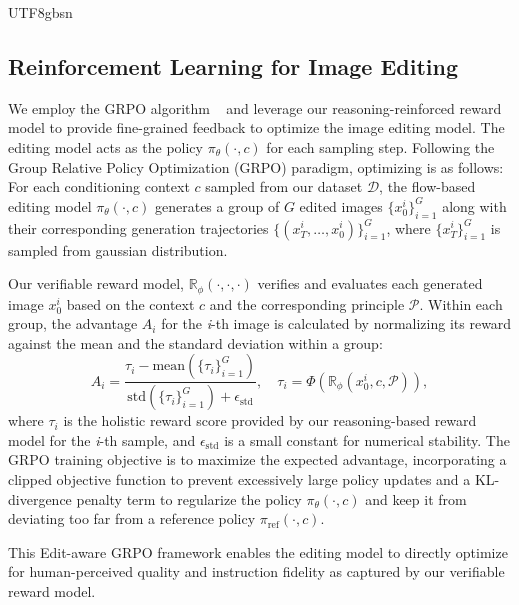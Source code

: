 \documentclass{llmxive}
\begin{document}
\begin{CJK*}{UTF8}{gbsn}
\subsection{Reinforcement Learning for Image Editing}
\label{sec:rl_for_editing}
We employ the GRPO algorithm ~\citep{liu2025flow} and leverage our reasoning-reinforced reward model to provide fine-grained feedback to optimize the image editing model.
The editing model acts as the policy $\pi_\theta(\cdot,c)$ for each sampling step. Following the Group Relative Policy Optimization (GRPO) paradigm, optimizing is as follows:
For each conditioning context $c$ sampled from our dataset $\mathcal{D}$, the flow-based editing model $\pi_\theta(\cdot,c)$ generates a group of $G$ edited images $\{x_0^i\}_{i=1}^G$ along with their corresponding generation trajectories $\{(x_T^i, \dots, x_0^i)\}_{i=1}^G$, where $\{x_T^i\}_{i=1}^G$ is sampled from gaussian distribution.

Our verifiable reward model, $\mathbb{R}_\phi(\cdot,\cdot,\cdot)$ verifies and evaluates each generated image $x_0^i$ based on the context $c$ and the corresponding principle $\mathcal{P}$. 
Within each group, the advantage $A_i$ for the \textit{i}-th image is calculated by normalizing its reward against the mean and the standard deviation within a group:
\vspace{-0.5em}
\begin{equation}
A_i = \frac{\tau_i - \text{mean}\left(\{\tau_i\}_{i=1}^G\right)}{\text{std}\left(\{ \tau_i\}_{i=1}^G\right) + \epsilon_{\text{std}}},\quad \tau_i = \Phi\!\left(\mathbb{R}_\phi(x_0^i, c, \mathcal{P})\right),
\label{eq:advantage}
\end{equation}
where $\tau_i$ is the holistic reward score provided by our reasoning-based reward model for the \textit{i}-th sample, and $\epsilon_{\text{std}}$ is a small constant for numerical stability.
The GRPO training objective is to maximize the expected advantage, incorporating a clipped objective function to prevent excessively large policy updates and a KL-divergence penalty term to regularize the policy $\pi_\theta(\cdot,c)$ and keep it from deviating too far from a reference policy $\pi_{\text{ref}}(\cdot,c)$. 

This Edit-aware GRPO framework enables the editing model to directly optimize for human-perceived quality and instruction fidelity as captured by our verifiable reward model.
\vspace{1em}




\end{CJK*}
\end{document}
